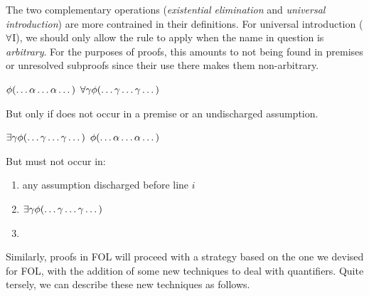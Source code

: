 The two complementary operations (\emph{existential elimination} and
\emph{universal introduction}) are more contrained in their definitions. For
universal introduction ($\forall$I), we should only allow the rule to apply
when the name in question is \emph{arbitrary}. For the purposes of proofs, this
amounts to not being found in premises or unresolved subproofs since their use
there makes them non-arbitrary.

\begin{fitchrule}
  \label{def:universal-introduction-rule}
  \leavevmode
  \vspace{-0.9\baselineskip}
  \begin{fitchproof}
     {$\phi(\dots\alpha\dots\alpha\dots)$}    
     {$\forall\gamma\phi(\dots\gamma\dots\gamma\dots)$} 
  \end{fitchproof}
  But only if \ealpha does not occur in a premise or an undischarged assumption.
\end{fitchrule}

\begin{fitchrule}
  \label{def:existential-elimination-rule}
  \leavevmode
  \vspace{-0.9\baselineskip}
  \begin{fitchproof}
     {$\exists\gamma\phi(\dots\gamma\dots\gamma\dots)$}
    \open
     {$\phi(\dots\alpha\dots\alpha\dots)$} 
     {\epsi}
    \close
     {\epsi} 
  \end{fitchproof}
  But \ealpha must not occur in:\\
  \begin{enumerate}
  \item any assumption discharged before line $i$
  \item $\exists\gamma\phi(\dots\gamma\dots\gamma\dots)$
  \item \epsi
  \end{enumerate}
\end{fitchrule}


Similarly, proofs in FOL will proceed with a strategy based on the one we
devised for FOL, with the addition of some new techniques to deal with
quantifiers. Quite tersely, we can describe these new techniques as follows.

